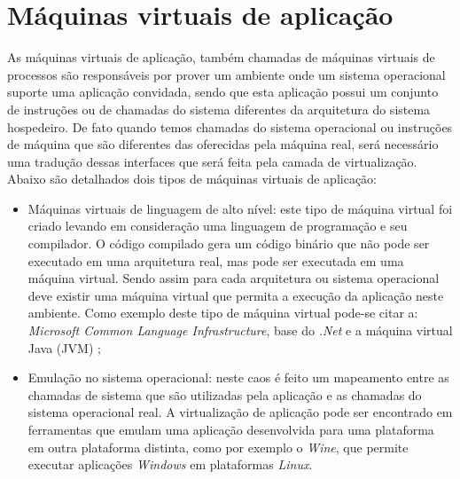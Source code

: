 \section{Máquinas virtuais de aplicação}
\label{section:virtaplicacao}

As máquinas virtuais de aplicação, também chamadas de máquinas virtuais de processos são responsáveis por prover um ambiente
onde um sistema operacional suporte uma aplicação convidada, sendo que esta aplicação possui um conjunto de instruções ou de chamadas
do sistema diferentes da arquitetura do sistema hospedeiro. De fato quando temos chamadas do sistema operacional ou instruções de máquina 
que são diferentes das oferecidas pela máquina real, será necessário uma tradução dessas interfaces que será feita pela camada  de 
virtualização. Abaixo são detalhados dois tipos de máquinas virtuais de aplicação:

\begin{itemize}
 \item Máquinas virtuais de linguagem de alto nível: este tipo de máquina virtual foi criado levando em consideração uma linguagem de 
 programação e seu compilador. O código compilado gera um código binário que não pode ser executado em uma arquitetura real, mas pode
 ser executada em uma máquina virtual. Sendo assim para cada arquitetura ou sistema operacional deve existir uma máquina virtual que
 permita a execução da aplicação neste ambiente. Como exemplo deste tipo de máquina virtual pode-se citar a: \textit{Microsoft Common 
 Language Infrastructure}, base do \textit{.Net} e a máquina virtual Java (\ac{JVM}) \cite{carissimi2008};
 \item Emulação no sistema operacional: neste caos é feito um mapeamento entre as chamadas de sistema que são utilizadas pela aplicação 
 e as chamadas do sistema operacional real. A virtualização de aplicação pode ser encontrado em ferramentas que emulam uma aplicação 
 desenvolvida para uma plataforma em outra plataforma distinta, como por exemplo o \textit{Wine}, que permite executar aplicações 
 \textit{Windows} em plataformas \textit{Linux}.
\end{itemize}


